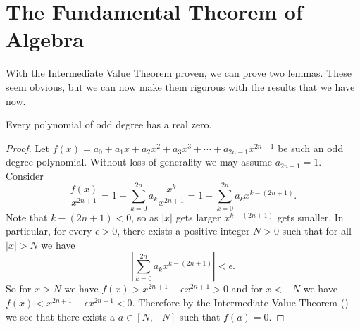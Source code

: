 \section{The Fundamental Theorem of Algebra}
With the Intermediate Value Theorem proven, we can prove two lemmas. These seem obvious, but we can now make them rigorous with the results that we have now.

\begin{lemma}\label{lemma-odd-degree-polynomial-has-real-zero}
    Every polynomial of odd degree has a real zero.
\end{lemma}
\begin{proof}
    Let $f(x) = a_0 + a_1x + a_2x^2 + a_3x^3 + \cdots + a_{2n-1}x^{2n-1}$ be such an odd degree polynomial. Without loss of generality we may assume $a_{2n-1} = 1$. Consider
    \[
        \frac{f(x)}{x^{2n+1}} = 1 + \sum_{k=0}^{2n}a_k\frac{x^k}{x^{2n+1}} = 1 + \sum_{k=0}^{2n}a_kx^{k-(2n+1)}.
    \]
    Note that $k - (2n+1) < 0$, so as $|x|$ gets larger $x^{k-(2n+1)}$ gets smaller. In particular, for every $\epsilon > 0$, there exists a positive integer $N > 0$ such that for all $|x| > N$ we have
    \[
        \left|\sum_{k=0}^{2n}a_kx^{k-(2n+1)}\right| < \epsilon.
    \]
    So for $x > N$ we have $f(x) > x^{2n+1} - \epsilon x^{2n+1} > 0$ and for $x < -N$ we have $f(x) < x^{2n+1} - \epsilon x^{2n+1} < 0$. Therefore by the Intermediate Value Theorem () we see that there exists a $a \in [N, -N]$ such that $f(a) = 0$.
\end{proof}

